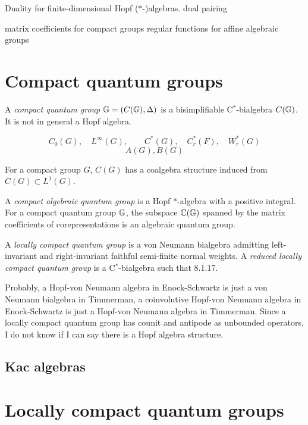 \documentclass{../../large}
\begin{document}
Duality for finite-dimensional Hopf ($*$-)algebras.
dual pairing





matrix coefficients for compact groups
regular functions for affine algebraic groups





\chapter{Compact quantum groups}

\begin{prb}
A \emph{compact quantum group} $\mathbb{G}=(C(\mathbb{G}),\Delta)$ is a bisimplifiable C$^*$-bialgebra $C(\mathbb{G})$.
It is not in general a Hopf algebra.
\end{prb}


\[C_0(G),\quad L^\infty(G),\qquad C^*(G),\quad C_r^*(F),\quad W_r^*(G)\]
\[A(G), B(G)\]

For a compact group $G$, $C(G)$ has a coalgebra structure induced from $C(G)\subset L^1(G)$.


\begin{prb}
A \emph{compact algebraic quantum group} is a Hopf $*$-algebra with a positive integral.
For a compact quantum group $\mathbb{G}$, the subspace $\mathbb{C}(\mathbb{G})$ spanned by the matrix coefficients of corepresentations is an algebraic quantum group.
\end{prb}


A \emph{locally compact quantum group} is a von Neumann bialgebra admitting left-invariant and right-invariant faithful semi-finite normal weights.
A \emph{reduced locally compact quantum group} is a C$^*$-bialgebra such that 8.1.17.


Probably, a Hopf-von Neumann algebra in Enock-Schwartz is just a von Neumann bialgebra in Timmerman, a coinvolutive Hopf-von Neumann algebra in Enock-Schwartz is just a Hopf-von Neumann algebra in Timmerman.
Since a locally compact quantum group has counit and antipode as unbounded operators, I do not know if I can say there is a Hopf algebra structure.


\section{Kac algebras}




\chapter{Locally compact quantum groups}
\end{document}
